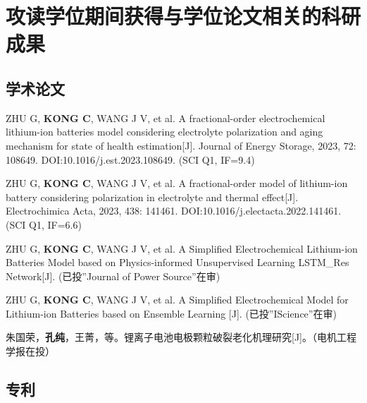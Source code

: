 \chapter{攻读学位期间获得与学位论文相关的科研成果}
\section*{学术论文}
\sloppy %
\begin{enumerate}[ {[}1{]} ]
\item ZHU G, \textbf{KONG C}, WANG J V, et al. A fractional-order electrochemical lithium-ion batteries model considering electrolyte polarization and aging mechanism for state of health estimation[J]. Journal of Energy Storage, 2023, 72: 108649. DOI:10.1016/j.est.2023.108649. (SCI Q1, IF=9.4)
\item ZHU G, \textbf{KONG C}, WANG J V, et al. A fractional-order model of lithium-ion battery considering polarization in electrolyte and thermal effect[J]. Electrochimica Acta, 2023, 438: 141461. DOI:10.1016/j.electacta.2022.141461. (SCI Q1, IF=6.6)
\item ZHU G, \textbf{KONG C}, WANG J V, et al. A Simplified Electrochemical Lithium-ion Batteries Model based on Physics-informed Unsupervised Learning LSTM\_Res Network[J]. (已投”Journal of Power Source”在审)
\item ZHU G, \textbf{KONG C}, WANG J V, et al. A Simplified Electrochemical Model for Lithium-ion Batteries based on Ensemble Learning [J]. (已投”IScience”在审)
\item 朱国荣，\textbf{孔纯}，王菁，等。锂离子电池电极颗粒破裂老化机理研究[J]。（电机工程学报在投）
\end{enumerate}
\section*{专利}















